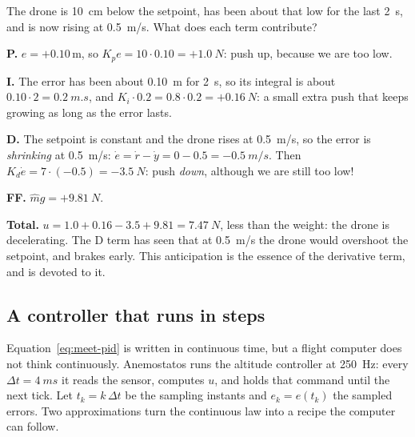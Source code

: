 \begin{example}
\label{ex:meet-terms}
The drone is \SI{10}{cm} below the setpoint, has been about that low for the last \SI{2}{s}, and is now rising at \SI{0.5}{m/s}. What does each term contribute?

\textbf{P.} $e = +0.10$\,m, so $K_p e = 10 \cdot 0.10 = +\SI{1.0}{N}$: push up, because we are too low.

\textbf{I.} The error has been about \SI{0.10}{m} for \SI{2}{s}, so its integral is about $0.10 \cdot 2 = \SI{0.2}{m.s}$, and $K_i \cdot 0.2 = 0.8 \cdot 0.2 = +\SI{0.16}{N}$: a small extra push that keeps growing as long as the error lasts.

\textbf{D.} The setpoint is constant and the drone rises at \SI{0.5}{m/s}, so the error is \emph{shrinking} at \SI{0.5}{m/s}: $\dot e = \dot r - \dot y = 0 - 0.5 = \SI{-0.5}{m/s}$. Then $K_d\dot e = 7 \cdot (-0.5) = -\SI{3.5}{N}$: push \emph{down}, although we are still too low!

\textbf{FF.} $\hat m g = +\SI{9.81}{N}$.

\textbf{Total.} $u = 1.0 + 0.16 - 3.5 + 9.81 = \SI{7.47}{N}$, less than the weight: the drone is decelerating. The D term has seen that at \SI{0.5}{m/s} the drone would overshoot the setpoint, and brakes early. This anticipation is the essence of the derivative term, and  is devoted to it.
\end{example}

\subsection{A controller that runs in steps}
Equation~\eqref{eq:meet-pid} is written in continuous time, but a flight computer does not think continuously. Anemostatos runs the altitude controller at \SI{250}{Hz}: every $\Delta t = \SI{4}{ms}$ it reads the sensor, computes $u$, and holds that command until the next tick. Let $t_k = k\,\Delta t$ be the sampling instants and $e_k = e(t_k)$ the sampled errors. Two approximations turn the continuous law into a recipe the computer can follow.

